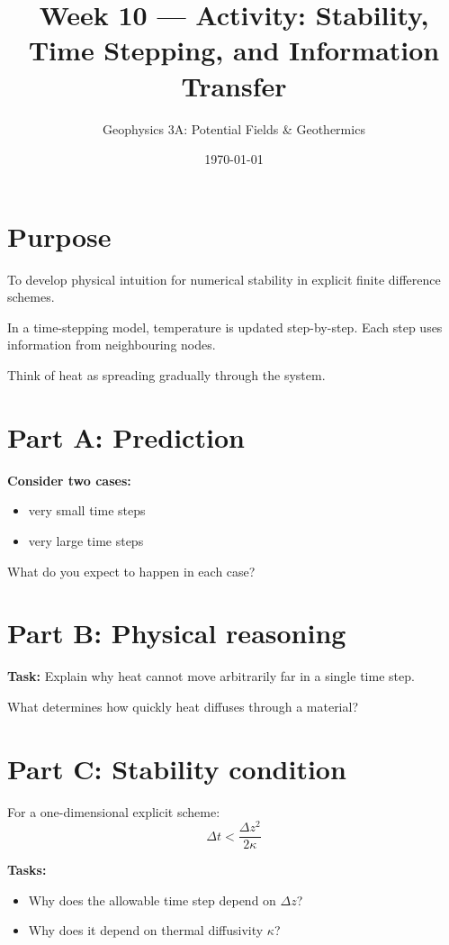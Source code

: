 \documentclass[11pt,a4paper]{article}
\title{Week 10 --- Activity: Stability, Time Stepping, and Information Transfer}
\author{Geophysics 3A: Potential Fields \& Geothermics}
\date{\today}
\begin{document}
\maketitle

\section*{Purpose}
To develop physical intuition for numerical stability in explicit finite
difference schemes.

In a time-stepping model, temperature is updated step-by-step. Each step uses information from neighbouring nodes.

Think of heat as spreading gradually through the system.

\section*{Part A: Prediction}

\textbf{Consider two cases:}
\begin{itemize}
    \item very small time steps
    \item very large time steps
\end{itemize}

What do you expect to happen in each case?

\section*{Part B: Physical reasoning}

\textbf{Task:}
Explain why heat cannot move arbitrarily far in a single time step.

What determines how quickly heat diffuses through a material?

\section*{Part C: Stability condition}

For a one-dimensional explicit scheme:
\begin{equation}
\Delta t < \frac{\Delta z^2}{2\kappa}
\end{equation}

\textbf{Tasks:}
\begin{itemize}
    \item Why does the allowable time step depend on $\Delta z$?
    \item Why does it depend on thermal diffusivity $\kappa$?
\end{itemize}
\end{document}
